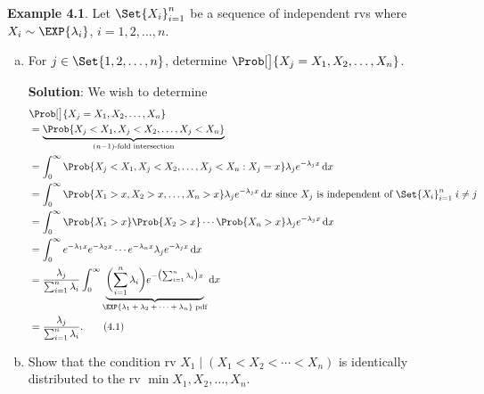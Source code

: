 \begin{Example}
    \textbf{Example 4.1}. Let $ \Set{X_i}_{i=1}^n $ be a sequence of independent rvs where $ X_i \sim \EXP{\lambda_i} $, $ i=1,2,\ldots,n $.
    \begin{enumerate}[(a)]
        \item For $ j\in\Set{1,2,\ldots,n} $, determine $ \Prob[\big]{X_j=\min{X_1,X_2,\ldots,X_n}} $.

              \textbf{Solution}: We wish to determine
              \begin{align*}
                   & \Prob[\big]{X_j=\min{X_1,X_2,\ldots,X_n}}                                                                                                                                                                                 \\
                   & =\underbrace{\Prob{X_j<X_1,X_j<X_2,\ldots,X_j<X_n}}_{(n-1)\text{-fold intersection}}                                                                                                                                      \\
                   & =\int_{0}^{\infty}\Prob{X_j<X_1,X_j<X_2,\ldots,X_j<X_n\given X_j=x}\lambda_j e^{-\lambda_j x}\odif{x}                                                                                                                     \\
                   & =\int_{0}^{\infty}\Prob{X_1>x,X_2>x,\ldots,X_n>x}\lambda_j e^{-\lambda_j x}\odif{x}\text{ since $X_j$ is independent of $ \Set{X_i}_{i=1}^n\; i\ne j $}                                                                   \\
                   & =\int_{0}^{\infty}\Prob{X_1>x}\Prob{X_2>x}\cdots\Prob{X_n>x}\lambda_j e^{-\lambda_j x}\odif{x}                                                                                                                            \\
                   & =\int_{0}^{\infty}e^{-\lambda_1 x}e^{-\lambda_2 x}\cdots e^{-\lambda_n x}\lambda_j e^{-\lambda_j x}\odif{x}                                                                                                               \\
                   & =\frac{\lambda_j}{\sum_{i=1}^{n}\lambda_i} \int_{0}^{\infty}\underbrace{\biggl(\sum_{i=1}^{n}\lambda_i\biggr)e^{-\bigl(\sum_{i=1}^{n}\lambda_i\bigr)x}}_{\text{$\EXP{\lambda_1+\lambda_2+\cdots+\lambda_n}$ pdf}}\odif{x} \\
                   & =\frac{\lambda_j}{\sum_{i=1}^{n}\lambda_i}.\tag*{(4.1)}\label{eq4.1}
              \end{align*}
        \item Show that the condition rv $ X_1\mid(X_1<X_2<\cdots<X_n) $ is identically distributed to the rv $ \min{X_1,X_2,\ldots,X_n} $.


\end{enumerate}
\end{Example}
